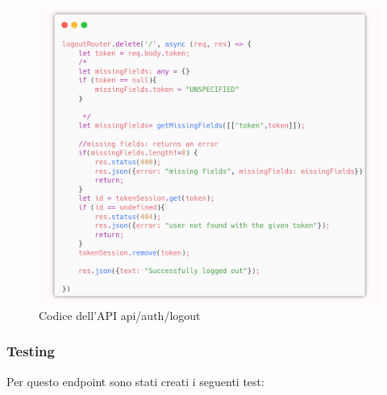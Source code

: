 \documentclass{report}
\begin{document}
\begin{figure}[H]
	\centering\includegraphics[width=1\textwidth]{images/microservizio-autenticazione/logout-carbon.png}
	Codice dell'API api/auth/logout
\end{figure}


\subsubsection*{Testing}
Per questo endpoint sono stati creati i seguenti test:
\end{document}
